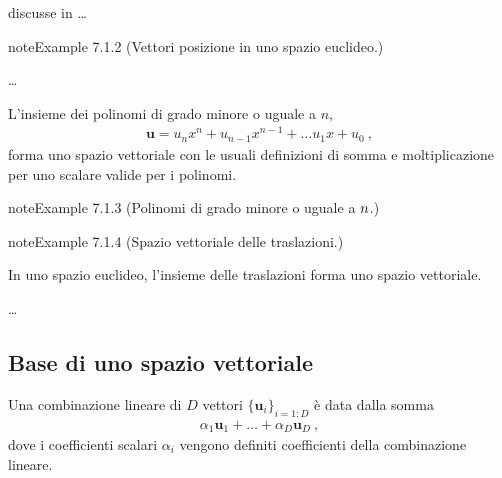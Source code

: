 \documentclass[letterpaper,10pt,italian]{jupyterBook}
\begin{document}
\sphinxAtStartPar
discusse in …
\label{ch/algebra/vector-algebra-def:ex-vectors-euclidean-space}
\begin{sphinxadmonition}{note}{Example 7.1.2 (Vettori posizione in uno spazio euclideo.)}



\sphinxAtStartPar
…
\end{sphinxadmonition}

\sphinxAtStartPar
{}
L’insieme dei polinomi di grado minore o uguale a \(n\),
\begin{equation*}
\begin{split}\mathbf{u} = u_n x^n + u_{n-1} x^{n-1} + \dots u_1 x + u_0 \ ,\end{split}
\end{equation*}
\sphinxAtStartPar
forma uno spazio vettoriale con le usuali definizioni di somma e moltiplicazione per uno scalare valide per i polinomi.
\label{ch/algebra/vector-algebra-def:ex-vectors-polynomials}
\begin{sphinxadmonition}{note}{Example 7.1.3 (Polinomi di grado minore o uguale a \protect\(n\protect\).)}


\end{sphinxadmonition}
\label{ch/algebra/vector-algebra-def:ex-vectors-euclidean-space-translation}
\begin{sphinxadmonition}{note}{Example 7.1.4 (Spazio vettoriale delle traslazioni.)}



\sphinxAtStartPar
In uno spazio euclideo, l’insieme delle traslazioni forma uno spazio vettoriale.

\sphinxAtStartPar
{}…
\end{sphinxadmonition}


\subsection{Base di uno spazio vettoriale}
\label{\detokenize{ch/algebra/vector-algebra-def:base-di-uno-spazio-vettoriale}}\label{\detokenize{ch/algebra/vector-algebra-def:math-hs-algebra-vector-def-basis}}
\sphinxAtStartPar
{} Una combinazione lineare di \(D\) vettori \(\{ \mathbf{u}_i \}_{i=1:D}\) è data dalla somma
\begin{equation*}
\begin{split}\alpha_1 \mathbf{u}_1 + \dots + \alpha_D \mathbf{u}_D \ ,\end{split}
\end{equation*}
\sphinxAtStartPar
dove i coefficienti scalari \(\alpha_i\) vengono definiti coefficienti della combinazione lineare.
\end{document}
